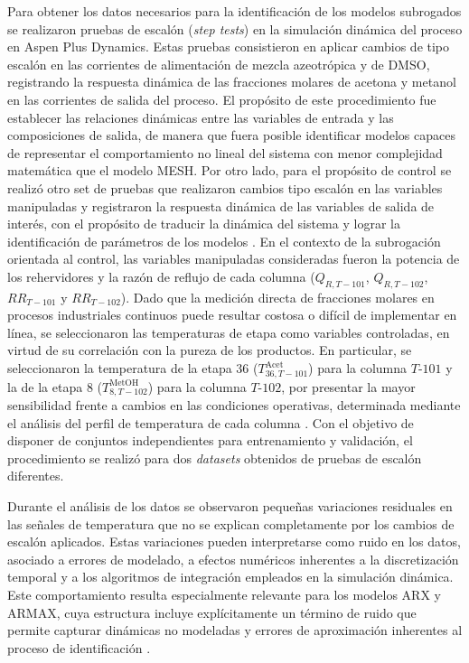 Para obtener los datos necesarios para la identificación de los modelos subrogados se realizaron pruebas de escalón (\textit{step tests}) en la simulación dinámica del proceso en Aspen Plus Dynamics. Estas pruebas consistieron en aplicar cambios de tipo escalón en las corrientes de alimentación de mezcla azeotrópica y de DMSO, registrando la respuesta dinámica de las fracciones molares de acetona y metanol en las corrientes de salida del proceso. El propósito de este procedimiento fue establecer las relaciones dinámicas entre las variables de entrada y las composiciones de salida, de manera que fuera posible identificar modelos capaces de representar el comportamiento no lineal del sistema con menor complejidad matemática que el modelo MESH. Por otro lado, para el propósito de control se realizó otro set de pruebas que realizaron cambios tipo escalón en las variables manipuladas y registraron la respuesta dinámica de las variables de salida de interés, con el propósito de traducir la dinámica del sistema y lograr la identificación de parámetros de los modelos \cite{ljung1999}. En el contexto de la subrogación orientada al control, las variables manipuladas consideradas fueron la potencia de los rehervidores y la razón de reflujo de cada columna ($Q_{R,T-101}$, $Q_{R,T-102}$, $RR_{T-101}$ y $RR_{T-102}$). Dado que la medición directa de fracciones molares en procesos industriales continuos puede resultar costosa o difícil de implementar en línea, se seleccionaron las temperaturas de etapa como variables controladas, en virtud de su correlación con la pureza de los productos. En particular, se seleccionaron la temperatura de la etapa 36 ($T_{36,T-101}^{\text{Acet}}$) para la columna $T\text{-}101$ y la de la etapa 8 ($T_{8,T-102}^{\text{MetOH}}$) para la columna $T\text{-}102$, por presentar la mayor sensibilidad frente a cambios en las condiciones operativas, determinada mediante el análisis del perfil de temperatura de cada columna \cite{ref10}. Con el objetivo de disponer de conjuntos independientes para entrenamiento y validación, el procedimiento se realizó para dos \textit{datasets} obtenidos de pruebas de escalón diferentes.

\vspace{0.5cm}

Durante el análisis de los datos se observaron pequeñas variaciones residuales en las señales de temperatura que no se explican completamente por los cambios de escalón aplicados. Estas variaciones pueden interpretarse como ruido en los datos, asociado a errores de modelado, a efectos numéricos inherentes a la discretización temporal y a los algoritmos de integración empleados en la simulación dinámica. Este comportamiento resulta especialmente relevante para los modelos ARX y ARMAX, cuya estructura incluye explícitamente un término de ruido que permite capturar dinámicas no modeladas y errores de aproximación inherentes al proceso de identificación \cite{soderstrom1989}.

